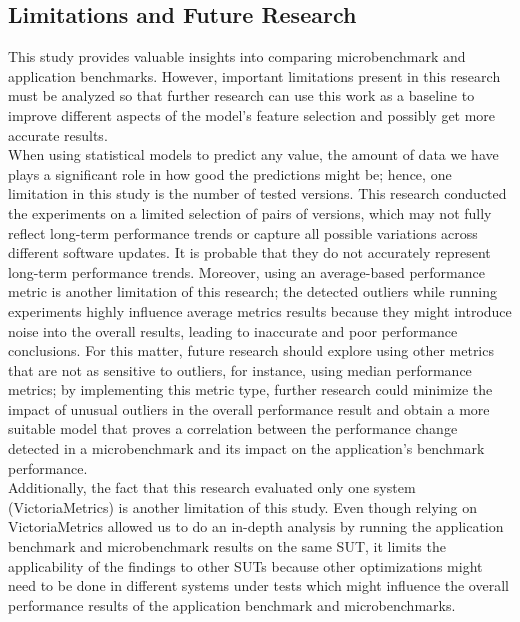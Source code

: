 \subsection{Limitations and Future Research}
\label{cha:limitationsFurtherWork}
This study provides valuable insights into comparing microbenchmark and application benchmarks. However, important limitations present in this research must be analyzed so that further research can use this work as a baseline to improve different aspects of the model’s feature selection and possibly get more accurate results. \\
When using statistical models to predict any value, the amount of data we have plays a significant role in how good the predictions might be; hence, one limitation in this study is the number of tested versions. This research conducted the experiments on a limited selection of pairs of versions, which may not fully reflect long-term performance trends or capture all possible variations across different software updates. It is probable that they do not accurately represent long-term performance trends.
Moreover, using an average-based performance metric is another limitation of this research; the detected outliers while running experiments highly influence average metrics results because they might introduce noise into the overall results, leading to inaccurate and poor performance conclusions. For this matter, future research should explore using other metrics that are not as sensitive to outliers, for instance, using median performance metrics; by implementing this metric type, further research could minimize the impact of unusual outliers in the overall performance result and obtain a more suitable model that proves a correlation between the performance change detected in a microbenchmark and its impact on the application’s benchmark performance.  \\
Additionally, the fact that this research evaluated only one system (VictoriaMetrics) is another limitation of this study. Even though relying on VictoriaMetrics allowed us to do an in-depth analysis by running the application benchmark and microbenchmark results on the same SUT, it limits the applicability of the findings to other SUTs because other optimizations might need to be done in different systems under tests which might influence the overall performance results of the application benchmark and microbenchmarks. \\
